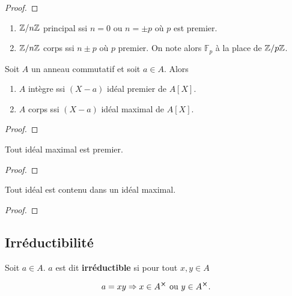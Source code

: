 \ifdefined\outputproof
\begin{proof}

\end{proof}
\fi

\begin{exemple}
	\begin{enumerate}
		\item $\mathbb{Z} / n \mathbb{Z}$ principal ssi $n = 0$ ou $n = \pm p$ où
			$p$ est premier.
		\item $\mathbb{Z} / n \mathbb{Z}$ corps ssi $n \pm p$ où $p$ premier.
			On note alors $\mathbb{F}_{p}$ à la place de $\mathbb{Z} / p
			\mathbb{Z}$.
	\end{enumerate}
\end{exemple}

\begin{proposition}
	Soit $A$ un anneau commutatif et soit $a \in A$. Alors
	\begin{enumerate}
		\item $A$ intègre ssi $(X - a)$ idéal premier de $A[X]$.
		\item $A$ corps ssi $(X - a)$ idéal maximal de $A[X]$.
	\end{enumerate}
\end{proposition}

\ifdefined\outputproof
\begin{proof}

\end{proof}
\fi

\begin{proposition}
	Tout idéal maximal est premier.
\end{proposition}

\ifdefined\outputproof
\begin{proof}

\end{proof}
\fi

\begin{theorem}
	Tout idéal est contenu dans un idéal maximal.
\end{theorem}

\ifdefined\outputproof
\begin{proof}

\end{proof}
\fi

\subsection{Irréductibilité}

\begin{definition} 
	\label{definition:irreductible_element}
	Soit $a \in A$. $a$ est dit \textbf{irréductible} si pour tout $x, y \in A$

	\begin{equation}
		a = xy \Rightarrow x \in A^{\cross} \text{ ou } y \in A^{\cross}.
	\end{equation}
\end{definition}

